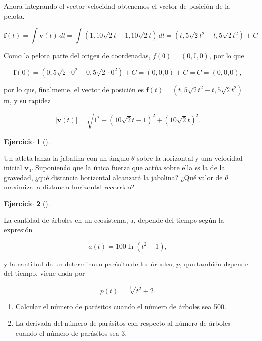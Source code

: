 \documentclass[
  a4paper,
]{scrreport}
\theoremstyle{definition}
\newtheorem{exercise}{Ejercicio}[chapter]
\theoremstyle{remark}
\begin{document}
\begin{tcolorbox}
Ahora integrando el vector velocidad obtenemos el vector de posición de
la pelota.

\[
\mathbf{f}(t)
= \int \mathbf{v}(t)\,dt 
= \int (1, 10\sqrt{2}t-1, 10\sqrt{2}t)\, dt 
= (t, 5\sqrt{2}t^2-t, 5\sqrt{2}t^2) + C
\]

Como la pelota parte del origen de coordenadas, \(f(0)=(0,0,0)\), por lo
que

\[
\mathbf{f}(0) 
= (0, 5\sqrt{2}\cdot 0^2-0, 5\sqrt{2}\cdot 0^2) + C 
= (0, 0, 0) + C 
= C 
= (0, 0, 0), 
\]

por lo que, finalmente, el vector de posición es
\(\mathbf{f}(t)=(t, 5\sqrt{2}t^2-t, 5\sqrt{2}t^2)\) m, y su rapidez

\[
|\mathbf{v}(t)| 
= \sqrt{1^2 + (10\sqrt{2}t-1)^2 + (10\sqrt{2}t)^2}.
\]

\end{tcolorbox}

\begin{exercise}[]\protect\hypertarget{exr-cinematica-jabalina}{}\label{exr-cinematica-jabalina}

Un atleta lanza la jabalina con un ángulo \(\theta\) sobre la horizontal
y una velocidad inicial \(\mathbf{v}_0\). Suponiendo que la única fuerza
que actúa sobre ella es la de la gravedad, ¿qué distancia horizontal
alcanzará la jabalina? ¿Qué valor de \(\theta\) maximiza la distancia
horizontal recorrida?

\end{exercise}

\begin{exercise}[]\protect\hypertarget{exr-parasitos}{}\label{exr-parasitos}

La cantidad de árboles en un ecosistema, \(a\), depende del tiempo según
la expresión

\[
a(t)=100\ln(t^2+1),
\]

y la cantidad de un determinado parásito de los árboles, \(p\), que
también depende del tiempo, viene dada por

\[
p(t) = \sqrt[3]{{t^2  + 2}}.
\]

\begin{enumerate}
\def\labelenumi{\alph{enumi}.}
\item
  Calcular el número de parásitos cuando el número de árboles sea 500.
\item
  La derivada del número de parásitos con respecto al número de árboles
  cuando el número de parásitos sea 3.
\end{enumerate}

\end{exercise}
\end{document}
